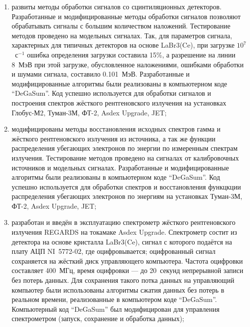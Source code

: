 \begin{enumerate}
  \item развиты методы обработки сигналов со сцинтиляционных детекторов. Разработанные и модифицированные методы обработки сигналов позволяют обрабатывать сигналы с большим количеством наложений. Тестирование методов проведено на модельных сигналах. Так, для параметров сигнала, характерных для типичных детекторов на основе LaBr3(Ce), при загрузке $10^7$~с${}^{-1}$ ошибка определения загрузки составила 15\%, а разрешение на линии 8~МэВ при этой загрузке, обусловленное наложениями, ошибками обработки и шумами сигнала, составило 0.101~МэВ. Разработанные и модифицированные алгоритмы были реализованы в компьютерном коде ``DeGaSum''. Код успешно используется для обработки сигналов и построения спектров жёсткого рентгеновского излучения на установках Глобус-М2, Туман-3М, ФТ-2, Asdex Upgrade, JET;

  \item модифицированы методы восстановления исходных спектров гамма и жёсткого рентгеновского излучения из источника, а так же функции распределения убегающих электронов по энергии по измеренным спектрам излучения. Тестирование методов проведено на сигналах от калибровочных источников и модельных сигналах. Разработанные и модифицированные алгоритмы были реализованы в компьютерном коде ``DeGaSum''. Код успешно используется для обработки спектров и восстановления функцкции распределения убегающих электронов по энергиям на установках Туман-3М, ФТ-2, Asdex Upgrade, JET;

  \item разработан и введён в эксплуатацию спектрометр жёсткого рентгеновского излучения REGARDS на токамаке Asdex Upgrade. Спектрометр состит из детектора на основе кристалла LaBr3(Ce), сигнал с которого подаётся на плату АЦП NI~5772-02, где оцифровывается; оцифрованный сигнал сохраняется на жёсткий диск управляющего компьютера. Частота оцифровки составляет 400~МГц, время оцифровки --- до 20~секунд непрерывной записи без потерь данных. Для сохранения такого потка данных на управляющий компьютер были использованы алгоритмы сжатия данных без потерь в реальном времени, реализованные в компьютером коде ``DeGaSum''. Компьютерный код ``DeGaSum'' был модифицирован для управления спектрометром (запуск, сохранение и обработка данных);


\end{enumerate}
